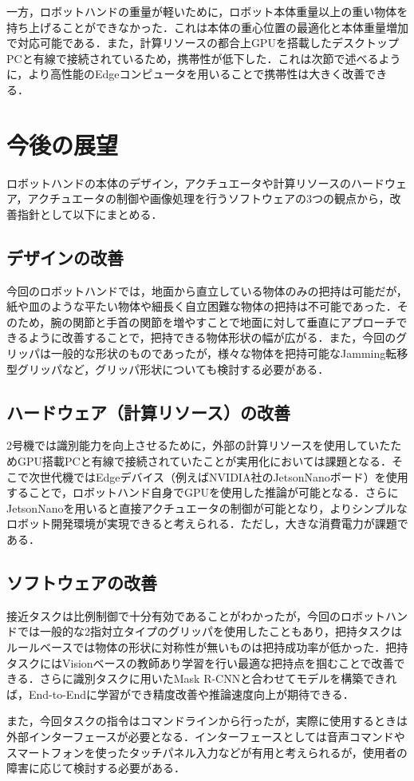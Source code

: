 一方，ロボットハンドの重量が軽いために，ロボット本体重量以上の重い物体を持ち上げることができなかった．これは本体の重心位置の最適化と本体重量増加で対応可能である．また，計算リソースの都合上GPUを搭載したデスクトップPCと有線で接続されているため，携帯性が低下した．これは次節で述べるように，より高性能のEdgeコンピュータを用いることで携帯性は大きく改善できる．


\section{今後の展望}\label{sec:今後の展望}
ロボットハンドの本体のデザイン，アクチュエータや計算リソースのハードウェア，アクチュエータの制御や画像処理を行うソフトウェアの3つの観点から，改善指針として以下にまとめる．

\subsection*{デザインの改善}
今回のロボットハンドでは，地面から直立している物体のみの把持は可能だが，紙や皿のような平たい物体や細長く自立困難な物体の把持は不可能であった．そのため，腕の関節と手首の関節を増やすことで地面に対して垂直にアプローチできるように改善することで，把持できる物体形状の幅が広がる．また，今回のグリッパは一般的な形状のものであったが，様々な物体を把持可能なJamming転移型グリッパ\cite{jamminggripper}など，グリッパ形状についても検討する必要がある．

\subsection*{ハードウェア（計算リソース）の改善}
2号機では識別能力を向上させるために，外部の計算リソースを使用していたためGPU搭載PCと有線で接続されていたことが実用化においては課題となる．そこで次世代機ではEdgeデバイス（例えばNVIDIA社のJetsonNanoボード）を使用することで，ロボットハンド自身でGPUを使用した推論が可能となる．さらにJetsonNanoを用いると直接アクチュエータの制御が可能となり，よりシンプルなロボット開発環境が実現できると考えられる．ただし，大きな消費電力が課題である．

\subsection*{ソフトウェアの改善}
接近タスクは比例制御で十分有効であることがわかったが，今回のロボットハンドでは一般的な2指対立タイプのグリッパを使用したこともあり，把持タスクはルールベースでは物体の形状に対称性が無いものは把持成功率が低かった．把持タスクにはVisionベースの教師あり学習を行い最適な把持点を掴むことで改善できる．さらに識別タスクに用いたMask R-CNNと合わせてモデルを構築できれば，End-to-Endに学習ができ精度改善や推論速度向上が期待できる．

また，今回タスクの指令はコマンドラインから行ったが，実際に使用するときは外部インターフェースが必要となる．インターフェースとしては音声コマンドやスマートフォンを使ったタッチパネル入力などが有用と考えられるが，使用者の障害に応じて検討する必要がある．

